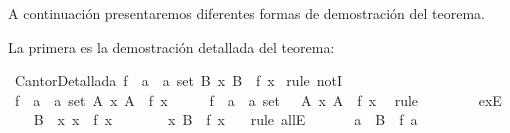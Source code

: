 \begin{isabellebody}
\begin{isamarkuptext}
A continuación presentaremos diferentes formas de demostración del
 teorema.%
\end{isamarkuptext}\isamarkuptrue%
%
\isadelimdocument
%
\endisadelimdocument
%
\isatagdocument
%
\isamarkuptrue%
%
\endisatagdocument
{\isafolddocument}%
%
\isadelimdocument
%
\endisadelimdocument
%
\begin{isamarkuptext}%
La primera es la demostración detallada del teorema:%
\end{isamarkuptext}\isamarkuptrue%
\isamarkupfalse%
\ CantorDetallada{\isacharcolon}\ {\isachardoublequoteopen}{\isasymnexists}f\ {\isacharcolon}{\isacharcolon}\ {\isacharprime}a\ {\isasymRightarrow}\ {\isacharprime}a\ set{\isachardot}\ {\isasymforall}B{\isachardot}\ {\isasymexists}x{\isachardot}\ B\ {\isacharequal}\ f\ x{\isachardoublequoteclose}\isanewline
%
\isadelimproof
%
\endisadelimproof
%
\isatagproof
{}\isamarkupfalse%
\ {\isacharparenleft}rule\ notI{\isacharparenright}\isanewline
\ \ \isamarkupfalse%
\ {\isachardoublequoteopen}{\isasymexists}f\ {\isacharcolon}{\isacharcolon}\ {\isacharprime}a\ {\isasymRightarrow}\ {\isacharprime}a\ set{\isachardot}\ {\isasymforall}A{\isachardot}\ {\isasymexists}x{\isachardot}\ A\ {\isacharequal}\ f\ x{\isachardoublequoteclose}\isanewline
\ \ \isamarkupfalse%
\ \isamarkupfalse%
\ f\ {\isacharcolon}{\isacharcolon}\ {\isachardoublequoteopen}{\isacharprime}a\ {\isasymRightarrow}\ {\isacharprime}a\ set{\isachardoublequoteclose}\ \ {\isacharasterisk}{\isacharcolon}\ {\isachardoublequoteopen}{\isasymforall}A{\isachardot}\ {\isasymexists}x{\isachardot}\ A\ {\isacharequal}\ f\ x{\isachardoublequoteclose}\ \isamarkupfalse%
\ {\isacharparenleft}rule\isanewline
\ \ \ \ \ \ \ \ exE{\isacharparenright}\isanewline
\ \ \isamarkupfalse%
\ {\isacharquery}B\ {\isacharequal}\ {\isachardoublequoteopen}{\isacharbraceleft}x{\isachardot}\ x\ {\isasymnotin}\ f\ x{\isacharbraceright}{\isachardoublequoteclose}\isanewline
\ \ \isamarkupfalse%
\ {\isacharasterisk}\ \isamarkupfalse%
\ {\isachardoublequoteopen}\ {\isasymexists}x{\isachardot}\ {\isacharquery}B\ {\isacharequal}\ f\ x\ {\isachardoublequoteclose}\ \isamarkupfalse%
\ {\isacharparenleft}rule\ allE{\isacharparenright}\isanewline
\ \ \isamarkupfalse%
\ \ \isamarkupfalse%
\ a\ \ {}{\isacharcolon}{\isachardoublequoteopen}{\isacharquery}B\ {\isacharequal}\ f\ a{\isachardoublequoteclose}\ \isamarkupfalse%

\end{isabellebody}
